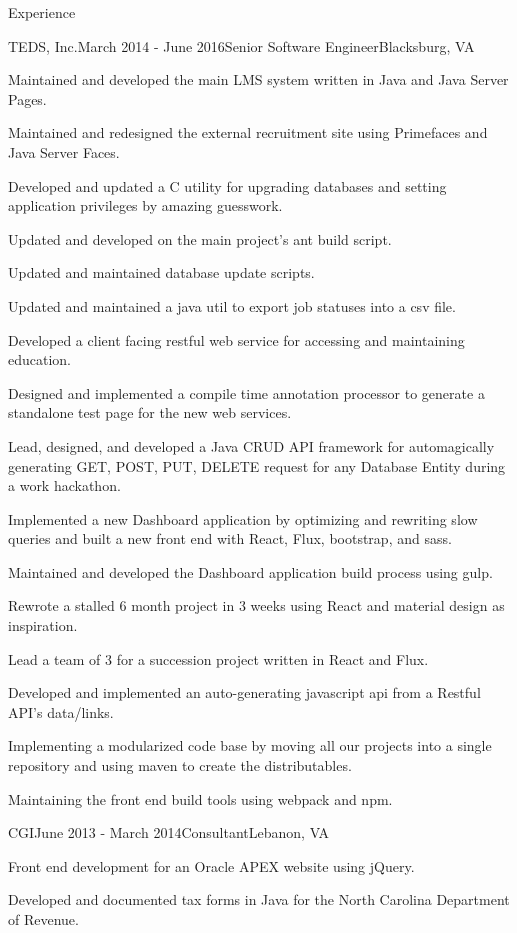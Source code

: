 \documentclass{resume} %
\begin{document}
\begin{rSection}{Experience}
\begin{rSubsection}{TEDS, Inc.}{March 2014 - June 2016}{Senior Software Engineer}{Blacksburg, VA}
\item Maintained and developed the main LMS system written in Java and Java Server Pages.
\item Maintained and redesigned the external recruitment site using Primefaces and Java Server Faces.
\item Developed and updated a C utility for upgrading databases and setting application privileges by amazing guesswork.
\item Updated and developed on the main project's ant build script.
\item Updated and maintained database update scripts.
\item Updated and maintained a java util to export job statuses into a csv file.
\item Developed a client facing restful web service for accessing and maintaining education.
\item Designed and implemented a compile time annotation processor to generate a standalone test page for the new web services.
\item Lead, designed, and developed a Java CRUD API framework for automagically generating GET, POST, PUT, DELETE request for any Database Entity during a work hackathon.
\item Implemented a new Dashboard application by optimizing and rewriting slow queries and built a new front end with React, Flux, bootstrap, and sass.
\item Maintained and developed the Dashboard application build process using gulp.
\item Rewrote a stalled 6 month project in 3 weeks using React and material design as inspiration.
\item Lead a team of 3 for a succession project written in React and Flux.
\item Developed and implemented an auto-generating javascript api from a Restful API's data/links.
\item Implementing a modularized code base by moving all our projects into a single repository and using maven to create the distributables.
\item Maintaining the front end build tools using webpack and npm.
\end{rSubsection}


\begin{rSubsection}{CGI}{June 2013 - March 2014}{Consultant}{Lebanon, VA}
\item Front end development for an Oracle APEX website using jQuery.
\item Developed and documented tax forms in Java for the North Carolina Department of Revenue.
\end{rSubsection}


\end{rSection}
\end{document}
